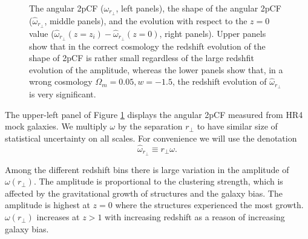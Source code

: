 \documentclass[iop]{emulateapj}
\begin{document}
\begin{figure}
   \caption{\label{fig_diffz}
  The angular 2pCF ($\omega_{r_\perp}$, left panels), the shape of the angular 2pCF ($\hat{\omega}_{r_\perp}$, middle panels),
  and the evolution with respect to the $z=0$ value ($\hat{\omega}_{r_{\perp}}(z=z_i) - \hat{\omega}_{r_{\perp}}(z=0)$, right panels). 
  Upper panels show that in the correct cosmology the redshift evolution of the shape of 2pCF is rather small regardless of the large redshfit evolution of the amplitude, 
  whereas the lower panels show that, in a wrong cosmology $\Omega_m = 0.05,w=-1.5$, the redshift evolution of $\hat{\omega}_{r_\perp}$ is very significant.
   }
\end{figure}

The upper-left panel of Figure \ref{fig_diffz} displays the angular 2pCF measured from HR4 mock galaxies. %
We multiply $\omega$ by the separation $r_\perp$ to have similar size of statistical uncertainty on all scales.
For convenience we will use the denotation
\begin{equation}
 \hat \omega_{r_{\perp}} \equiv r_{\perp} \omega.
\end{equation}


Among the different redshift bins there is large variation in the amplitude of $\omega(r_\perp)$.
The amplitude is proportional to the clustering strength, which is affected by the gravitational growth of structures and the galaxy bias.
The amplitude is highest at $z=0$ where the structures experienced the most growth.
$\omega(r_\perp)$ increases at $z>1$ with increasing redshift 
as a reason of increasing galaxy bias.
\end{document}
